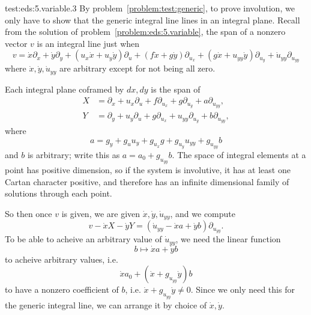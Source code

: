 \begin{answer}{test:eds:5.variable.3}
By problem~\vref{problem:test:generic}, to prove involution, we only have to show that the generic integral line lines in an integral plane.
Recall from the solution of problem~\vref{problem:eds:5.variable}, the span of a nonzero vector \(v\) is an integral line just when
\[
v=
\dot{x}\partial_x+
\dot{y}\partial_y+
(u_x\dot{x}+u_y\dot{y})\partial_u+
(f\dot{x}+g\dot{y})\partial_{u_x}+
(g\dot{x}+u_{yy}\dot{y})\partial_{u_y}+
\dot{u}_{yy}\partial_{u_{yy}}
\]
where \(\dot{x},\dot{y},\dot{u}_{yy}\) are arbitrary except for not being all zero.

Each integral plane coframed by \(dx,dy\) is the span of
\begin{align*}
X&=\partial_x+u_x\partial_u+f\partial_{u_x}+g\partial_{u_y}+a\partial_{u_{yy}},\\
Y&=\partial_y+u_y\partial_u+g\partial_{u_x}+u_{yy}\partial_{u_y}+b\partial_{u_{yy}},
\end{align*}
where
\[
a=g_y+g_u u_y + g_{u_x} g + g_{u_y} u_{yy}+g_{u_{yy}}b
\]
and \(b\) is arbitrary; write this as \(a=a_0+g_{u_{yy}}b\).
The space of integral elements at a point has positive dimension, so if the system is involutive, it has at least one Cartan character positive, and therefore has an infinite dimensional family of solutions through each point.

So then once \(v\) is given, we are given \(\dot{x},\dot{y},\dot{u}_{yy}\), and we compute 
\[
v-\dot{x}X-\dot{y}Y
=
(\dot{u}_{yy}-\dot{x}a+\dot{y}b)\partial_{u_{yy}}.
\]
To be able to acheive an arbitrary value of \(\dot{u}_{yy}\), we need the linear function 
\[
b\mapsto \dot{x}a+\dot{y}b
\]
to acheive arbitrary values, i.e.
\[
\dot{x}a_0+(\dot{x}+g_{u_{yy}}\dot{y})b
\]
to have a nonzero coefficient of \(b\), i.e. \(\dot{x}+g_{u_{yy}}\dot{y}\ne 0\).
Since we only need this for the generic integral line, we can arrange it by choice of \(\dot{x},\dot{y}\).
\end{answer}
